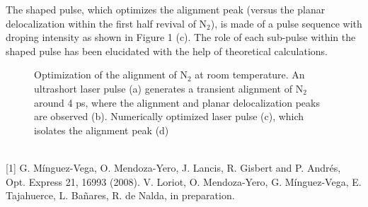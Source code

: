 The shaped pulse, which optimizes the alignment peak (versus the planar
delocalization within the first half revival of N$_{2}$), is made of a pulse sequence with
droping intensity as shown in Figure 1 (c). The role of each sub-pulse within the
shaped pulse has been elucidated with the help of theoretical calculations.
\begin{figure}[h]
 \centerline{}
 \caption[]{Optimization of the alignment of N$_{2}$ at room temperature. An ultrashort laser pulse (a) generates a transient alignment of N$_{2}$ around 4 ps, where the alignment and planar delocalization peaks are observed (b). Numerically optimized laser pulse (c), which isolates the alignment peak (d)}\label{figure 1}
\end{figure}
\\
{\footnotesize
[1] G. Mínguez-Vega, O. Mendoza-Yero, J. Lancis, R. Gisbert and P. Andrés, Opt. Express 21, 16993
(2008).
\newline
[2] V. Loriot, O. Mendoza-Yero, G. Mínguez-Vega, E. Tajahuerce, L. Bañares, R. de Nalda, in
preparation.
}

\newpage
\section*{}
\setcounter{figure}{0}

